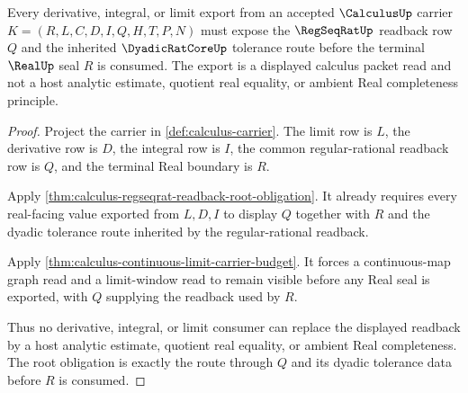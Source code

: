 \begin{theorem}
\label{thm:calculus-root-obligation-regular-readback}
Every derivative, integral, or limit export from an accepted $\CalculusUp$ carrier $K=(R,L,C,D,I,Q,H,T,P,N)$ must expose the $\RegSeqRatUp$ readback row $Q$ and the inherited $\DyadicRatCoreUp$ tolerance route before the terminal $\RealUp$ seal $R$ is consumed. The export is a displayed calculus packet read and not a host analytic estimate, quotient real equality, or ambient Real completeness principle.
\end{theorem}
\begin{proof}
Project the carrier in \autoref{def:calculus-carrier}. The limit row is $L$, the derivative row is $D$, the integral row is $I$, the common regular-rational readback row is $Q$, and the terminal Real boundary is $R$.

Apply \autoref{thm:calculus-regseqrat-readback-root-obligation}. It already requires every real-facing value exported from $L,D,I$ to display $Q$ together with $R$ and the dyadic tolerance route inherited by the regular-rational readback.

Apply \autoref{thm:calculus-continuous-limit-carrier-budget}. It forces a continuous-map graph read and a limit-window read to remain visible before any Real seal is exported, with $Q$ supplying the readback used by $R$.

Thus no derivative, integral, or limit consumer can replace the displayed readback by a host analytic estimate, quotient real equality, or ambient Real completeness. The root obligation is exactly the route through $Q$ and its dyadic tolerance data before $R$ is consumed.
\end{proof}

